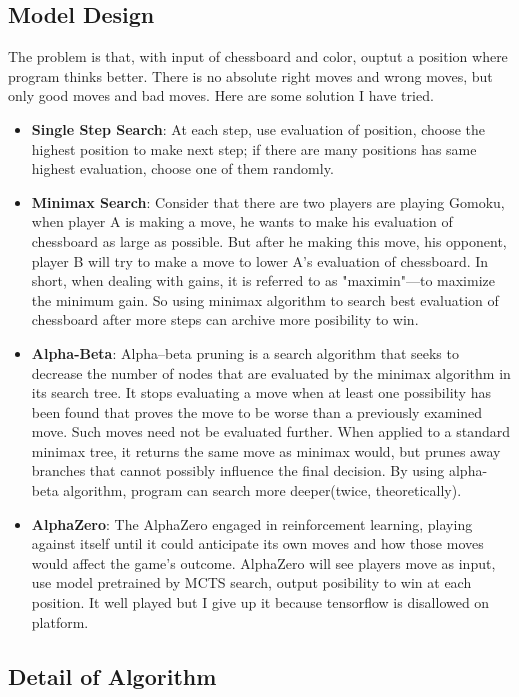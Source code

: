 \documentclass[lang=en,12pt]{elegantpaper}
\begin{document}
\subsection{Model Design}
The problem is that, with input of chessboard and color, ouptut a position where program thinks better.
There is no absolute right moves and wrong moves, but only good moves and bad moves. Here are some solution I have tried.
\begin{itemize}
  \item {\bf Single Step Search}: At each step, use evaluation of position, choose the highest position to make next step;
  if there are many positions has same highest evaluation, choose one of them randomly.
  \item {\bf Minimax Search}: Consider that there are two players are playing Gomoku, when player A is making a move,
  he wants to make his evaluation of chessboard as large as possible.
  But after he making this move, his opponent,
  player B will try to make a move to lower A's evaluation of chessboard. In short, when dealing with gains, it is referred to as "maximin"—to maximize the minimum gain. \cite{minimax}
  So using minimax algorithm to search best evaluation of chessboard after more steps can archive more posibility to win.
  \item {\bf Alpha-Beta}: Alpha–beta pruning is a search algorithm that seeks to decrease the number of nodes that are evaluated by the minimax algorithm in its search tree. It stops evaluating a move when at least one possibility has been found that proves the move to be worse than a previously examined move. Such moves need not be evaluated further. When applied to a standard minimax tree, it returns the same move as minimax would, but prunes away branches that cannot possibly influence the final decision.\cite{alphabeta}
  By using alpha-beta algorithm, program can search more deeper(twice, theoretically).
  \item {\bf AlphaZero}:  The AlphaZero engaged in reinforcement learning, playing against itself until it could anticipate its own moves and how those moves would affect the game's outcome.
  \cite{alphazero} AlphaZero will see players move as input,
  use model pretrained by MCTS search,
  output posibility to win at each position.
  It well played but I give up it because tensorflow is disallowed on platform.
\end{itemize}

\newpage
\subsection{Detail of Algorithm}
\end{document}
